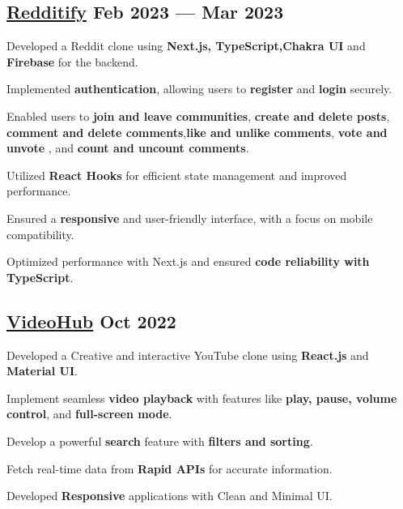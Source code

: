 
\subsection{{\href{https://reddit-clonee-app.vercel.app/}{Redditify} \hfill Feb 2023 --- Mar 2023}}
\begin{zitemize}
\item Developed a Reddit clone using \textbf{Next.js, TypeScript,Chakra UI} and \textbf{Firebase} for the backend.
\item Implemented \textbf{authentication}, allowing users to \textbf{register} and \textbf{login} securely.
\item Enabled users to \textbf{join and leave communities}, \textbf{create and delete posts}, \textbf{comment and delete comments},\textbf{like and unlike comments},  \textbf{vote and unvote} , and  \textbf{count and uncount comments}.
\item Utilized \textbf{React Hooks} for efficient state management and improved performance.
\item Ensured a \textbf{responsive} and user-friendly interface, with a focus on mobile compatibility.
\item Optimized performance with Next.js and ensured \textbf{code reliability with TypeScript}.

\end{zitemize}


\subsection{{\href{https://youtubee.vercel.app/}{VideoHub} \hfill Oct 2022}}
\begin{zitemize}
\item Developed a Creative and interactive YouTube clone using \textbf{React.js} and \textbf{Material UI}.
\item  Implement seamless \textbf{video playback} with features like \textbf{play, pause, volume control}, and \textbf{full-screen mode}.
\item  Develop a powerful \textbf{search} feature with \textbf{filters and sorting}.
\item  Fetch real-time data from \textbf{Rapid APIs} for accurate information.
\item  Developed \textbf{Responsive} applications with Clean and Minimal UI.
\end{zitemize}

